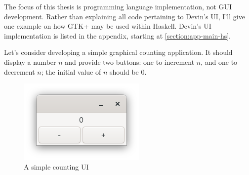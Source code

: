 \documentclass[UdineBachThesis,american,11pt]{PhdThesis}
\begin{document}
  The focus of this thesis is programming language implementation, not GUI
  development. Rather than explaining all code pertaining to Devin's UI, I'll
  give one example on how GTK+ may be used within Haskell. Devin's UI
  implementation is listed in the appendix, starting at
  \autoref{section:app-main-hs}.

  Let's consider developing a simple graphical counting application. It should
  display a number $n$ and provide two buttons: one to increment $n$, and one to
  decrement $n$; the initial value of $n$ should be $0$.

  \begin{figure}[H]
    \centering
    \includegraphics[scale=0.8]{7.png}
    \caption{A simple counting UI}
  \end{figure}
\end{document}
